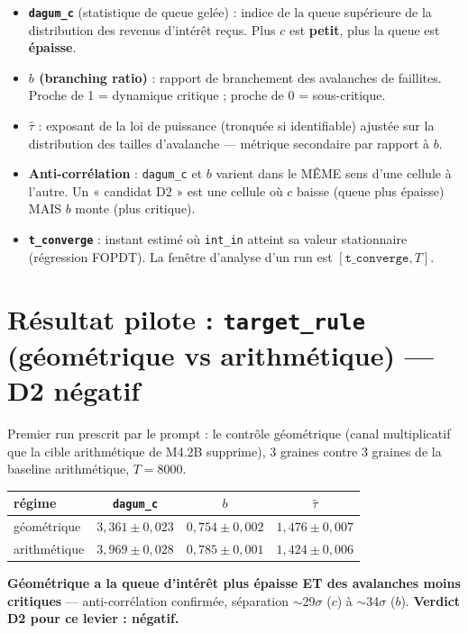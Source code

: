 \documentclass[11pt,a4paper]{article}
\newcommand{\code}[1]{\texttt{#1}}
\begin{document}
\begin{itemize}
\item \textbf{\code{dagum\_c}} (statistique de queue gelée) : indice de
  la queue supérieure de la distribution des revenus d'intérêt reçus.
  Plus $c$ est \textbf{petit}, plus la queue est \textbf{épaisse}.
\item \textbf{$b$ (branching ratio)} : rapport de branchement des
  avalanches de faillites. Proche de 1 = dynamique critique ; proche de
  0 = sous-critique.
\item \textbf{$\hat\tau$} : exposant de la loi de puissance (tronquée si
  identifiable) ajustée sur la distribution des tailles d'avalanche ---
  métrique secondaire par rapport à $b$.
\item \textbf{Anti-corrélation} : \code{dagum\_c} et $b$ varient dans le
  MÊME sens d'une cellule à l'autre. Un « candidat D2 » est une cellule
  où $c$ baisse (queue plus épaisse) MAIS $b$ monte (plus critique).
\item \textbf{\code{t\_converge}} : instant estimé où \code{int\_in}
  atteint sa valeur stationnaire (régression FOPDT). La fenêtre d'analyse
  d'un run est $[\code{t\_converge}, T]$.
\end{itemize}

\section{Résultat pilote : \code{target\_rule} (géométrique vs arithmétique) --- D2 négatif}
\label{sec:pilote}

Premier run prescrit par le prompt : le contrôle géométrique (canal
multiplicatif que la cible arithmétique de M4.2B supprime), 3 graines
contre 3 graines de la baseline arithmétique, $T=8000$.

\begin{table}[H]
\centering
\begin{tabular}{lccc}
\toprule
régime & \code{dagum\_c} & $b$ & $\hat\tau$ \\
\midrule
géométrique & $3{,}361 \pm 0{,}023$ & $0{,}754 \pm 0{,}002$ & $1{,}476 \pm 0{,}007$ \\
arithmétique & $3{,}969 \pm 0{,}028$ & $0{,}785 \pm 0{,}001$ & $1{,}424 \pm 0{,}006$ \\
\bottomrule
\end{tabular}
\end{table}

\textbf{Géométrique a la queue d'intérêt plus épaisse ET des avalanches
moins critiques} --- anti-corrélation confirmée, séparation
$\sim$29$\sigma$ ($c$) à $\sim$34$\sigma$ ($b$). \textbf{Verdict D2 pour
ce levier : négatif.}
\end{document}
